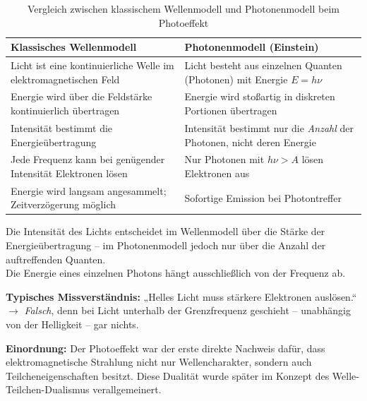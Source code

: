 \vspace{1em}
\begin{table}[H]
	\centering
	\begin{tabular}{|p{4.75cm}|p{4.75cm}|} %
		\hline
		\textbf{Klassisches Wellenmodell} & \textbf{Photonenmodell (Einstein)} \\
		\hline
		Licht ist eine kontinuierliche Welle im elektromagnetischen Feld & Licht besteht aus einzelnen Quanten (Photonen) mit Energie \( E = h\nu \) \\
		\hline
		Energie wird über die Feldstärke kontinuierlich übertragen & Energie wird stoßartig in diskreten Portionen übertragen \\
		\hline
		Intensität bestimmt die Energieübertragung & Intensität bestimmt nur die \emph{Anzahl} der Photonen, nicht deren Energie \\
		\hline
		Jede Frequenz kann bei genügender Intensität Elektronen lösen & Nur Photonen mit \( h\nu > A \) lösen Elektronen aus \\
		\hline
		Energie wird langsam angesammelt; Zeitverzögerung möglich & Sofortige Emission bei Photontreffer \\
		\hline
	\end{tabular}
	\caption{Vergleich zwischen klassischem Wellenmodell und Photonenmodell beim Photoeffekt}
	\label{tab:vergleich_photoeffekt}
\end{table}
\newpage
\noindent
\vspace{1em}

\begin{tcolorbox}[didaktikbox, title=Didaktische Klarstellung]
	\label{box:didaktischeKlarstellung}
	\small
	Die Intensität des Lichts entscheidet im Wellenmodell über die Stärke der Energieübertragung – im Photonenmodell jedoch nur über die Anzahl der auftreffenden Quanten.\\
	Die Energie eines einzelnen Photons hängt ausschließlich von der Frequenz ab.
\end{tcolorbox}
\vspace{1em}
\textbf{Typisches Missverständnis:}  
„Helles Licht muss stärkere Elektronen auslösen.“  
$\rightarrow$ \emph{Falsch}, denn bei Licht unterhalb der Grenzfrequenz geschieht – unabhängig von der Helligkeit – gar nichts.

\textbf{Einordnung:}  
Der Photoeffekt war der erste direkte Nachweis dafür, dass elektromagnetische Strahlung nicht nur Wellencharakter, sondern auch Teilcheneigenschaften besitzt. Diese Dualität wurde später im Konzept des Welle-Teilchen-Dualismus verallgemeinert.
